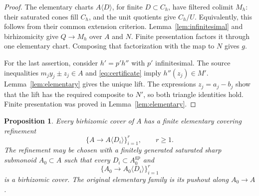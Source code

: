 \documentclass[11pt]{article}
\newtheorem{proposition}[theorem]{Proposition}
\theoremstyle{definition}
\theoremstyle{remark}
\newcommand{\gp}{\mathrm{gp}}
\begin{document}
\begin{proof}
The elementary charts $A\langle D\rangle$, for finite $D\subset C_h$, have filtered colimit $M_h$: their saturated cones fill $C_h$, and the unit quotients give $C_h/U$. Equivalently, this follows from their common extension criterion. Lemma~\ref{lem:infinitesimal} and birhizomicity give $Q\to M_h$ over $A$ and $N$. Finite presentation factors it through one elementary chart. Composing that factorization with the map to $N$ gives $g$.

For the last assertion, consider $h'=p'h''$ with $p'$ infinitesimal. The source inequalities $m_jy_j\pm z_j\in A$ and \eqref{eq:certificate} imply $h''(z_j)\in M'$. Lemma~\ref{lem:elementary} gives the unique lift. The expressions $z_j=a_j-b_j$ show that the lift has the required composite to $N'$, so both triangle identities hold. Finite presentation was proved in Lemma~\ref{lem:elementary}.
\end{proof}

\begin{proposition}\label{prop:finite-refinement}
Every birhizomic cover of $A$ has a finite elementary covering refinement
\[
 \{A\longrightarrow A\langle D_i\rangle\}_{i=1}^r,\qquad r\geq1.
\]
The refinement may be chosen with a finitely generated saturated sharp submonoid $A_0\subset A$ such that every $D_i\subset A_0^{\gp}$ and
\[
 \{A_0\longrightarrow A_0\langle D_i\rangle\}_{i=1}^r
\]
is a birhizomic cover. The original elementary family is its pushout along $A_0\to A$.
\end{proposition}
\end{document}
